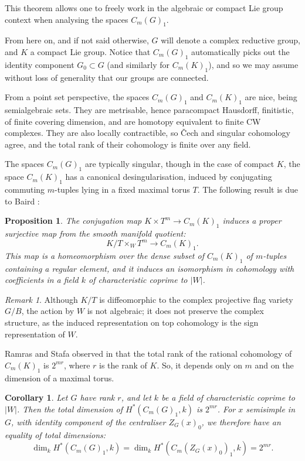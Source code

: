 \documentclass[oneside, 12pt, a4paper]{amsart}
\numberwithin{equation}{section}
\theoremstyle{plain}
\newtheorem{proposition}[theorem]{Proposition}
\newtheorem{corollary}[theorem]{Corollary}
\theoremstyle{definition}
\theoremstyle{remark}
\newtheorem{remark}[theorem]{Remark}
\begin{document}
This theorem allows one to freely work in the algebraic or compact Lie group context when analysing the spaces $C_m(G)_1$. 

From here on, and if not said otherwise, $G$ will denote a complex reductive group, and $K$ a compact Lie group. Notice that $C_m(G)_1$ automatically picks out the identity component $G_0\subset G$ (and similarly for $C_m(K)_1$), and so we may assume without loss of generality that our groups are connected.

From a point set perspective, the spaces $C_m(G)_1$ and $C_m(K)_1$ are nice, being semialgebraic sets. They are metrisable, hence paracompact Hausdorff, finitistic, of finite covering dimension, and are homotopy equivalent to finite CW complexes. They are also locally contractible, so \v{C}ech and singular cohomology agree, and the total rank of their cohomology is finite over any field.

The spaces $C_m(G)_1$ are typically singular, though in the case of compact $K$, the space $C_m(K)_1$ has a canonical desingularisation, induced by conjugating commuting $m$-tuples lying in a fixed maximal torus $T$. The following result is due to Baird \cite{Baird}:

\begin{proposition}\label{prop:desing}
The conjugation map $K\times T^m\to C_m(K)_1$ induces a proper surjective map from the smooth manifold quotient: \[K/T\times_W T^m\to C_m(K)_1.\] This map is a homeomorphism over the dense subset of $C_m(K)_1$ of $m$-tuples containing a regular element, and it induces an isomorphism in cohomology with coefficients in a field $k$ of characteristic coprime to $|W|$.
\end{proposition}

\begin{remark}
Although $K/T$ is diffeomorphic to the complex projective flag variety $G/B$, the action by $W$ is not algebraic; it does not preserve the complex structure, as the induced representation on top cohomology is the sign representation of $W$.
\end{remark}

Ramras and Stafa observed in \cite[Corollary 5.2]{RamrasStafa} that the total rank of the rational cohomology of $C_m(K)_1$ is $2^{mr}$, where $r$ is the rank of $K$. So, it depends only on $m$ and on the dimension of a maximal torus.



\begin{corollary} \label{cor:constantrank}
Let $G$ have rank $r$, and let $k$ be a field of characteristic coprime to $|W|$. Then the total dimension of  $H^*(C_m(G)_1,k)$ is $2^{mr}$. For $x$ semisimple in $G$, with identity component of the centraliser $Z_G(x)_0$, we therefore have an equality of total dimensions:
\[\dim_k H^*(C_m(G)_1,k)=\dim_k H^*(C_m(Z_G(x)_0)_1,k)=2^{mr}.\]
\end{corollary}
\end{document}
